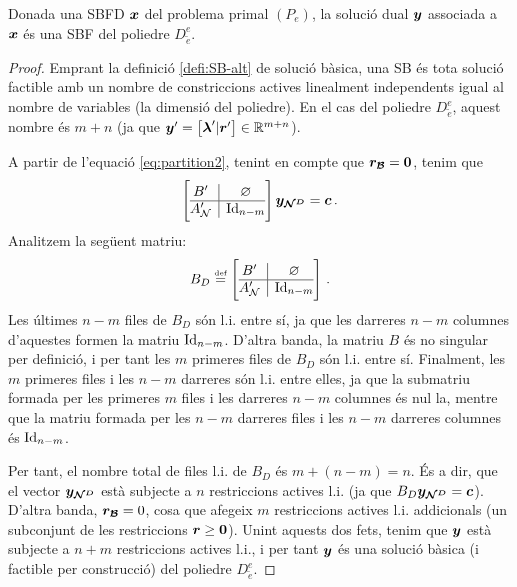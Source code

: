 \begin{prop}\label{prop:SD-SDBF}
	Donada una SBFD $\boldsymbol{x}$ del problema primal $(P_e)$, la solució dual 
	$\boldsymbol{y}$ associada a $\boldsymbol{x}$ és una SBF del poliedre $D^e_{\tilde{e}}$.
	\begin{proof}
		Emprant la definició \ref{defi:SB-alt} de solució bàsica, una SB és 
		tota solució factible amb un nombre de constriccions actives linealment 
		independents igual al nombre de variables (la dimensió del poliedre). 
		En el cas del poliedre $D^e_{\tilde{e}}$, aquest nombre és $m+n$ (ja 
		que $\boldsymbol{y}' = \left[\boldsymbol{\lambda}'\vert \boldsymbol{r}'\right]\in \mathbb{R}^{m+n}$).
		
		A partir de l'equació \eqref{eq:partition2}, tenint en compte que 
		$\boldsymbol{r_{\mathcal{B}}}=\boldsymbol{0}$, tenim que
		\[
		\left[\begin{array}{{@{}c|c@{}}}
		B'	  &	\varnothing	\\
		\hline
		A_\N' & \Id_{n-m}
		\end{array}\right]
		\vb{y_{\N^D}} = \vb{c}\,.
		\]
		Analitzem la següent matriu:
		\[
		B_D \defeq \left[
		\begin{array}{@{}c|c@{}}
		B'	  &	\varnothing	\\
		\hline
		A_\N' & \Id_{n-m}
		\end{array}
		\right]\,.
		\]
		Les últimes $n-m$ files de $B_D$ són l.i. entre sí, ja que les darreres 
		$n-m$ columnes d'aquestes formen la matriu $\operatorname{Id}_{n-m}$. D'altra banda, 
		la matriu $B$ és no singular per definició, i per tant les $m$ primeres 
		files de $B_D$ són l.i. entre sí. Finalment, les $m$ primeres files i 
		les $n-m$ darreres són l.i. entre elles, ja que la submatriu formada 
		per les primeres $m$ files i les darreres $n-m$ columnes és nul\lgem 
		la, 
		mentre que la matriu formada per les $n-m$ darreres files i les $n-m$ 
		darreres columnes és $\operatorname{Id}_{n-m}$.
		
		Per tant, el nombre total de files l.i. de $B_D$ és $m+(n-m) = n$. És a 
		dir, que el vector $\boldsymbol{y_{\mathcal{N}^D}}$ està subjecte a $n$ restriccions 
		actives l.i. (ja que $B_D \boldsymbol{y_{\mathcal{N}^D}} = \boldsymbol{c}$). D'altra banda, 
		$\boldsymbol{r_{\mathcal{B}}} = 0$, cosa que afegeix $m$ restriccions actives l.i. 
		addicionals (un subconjunt de les restriccions $\boldsymbol{r}\ge\boldsymbol{0}$). 
		Unint aquests dos fets, tenim que $\boldsymbol{y}$ està subjecte a $n+m$ 
		restriccions actives l.i., i per tant $\boldsymbol{y}$ és una solució bàsica (i 
		factible per construcció) del poliedre $D^e_{\tilde{e}}$.
	\end{proof}
\end{prop}

